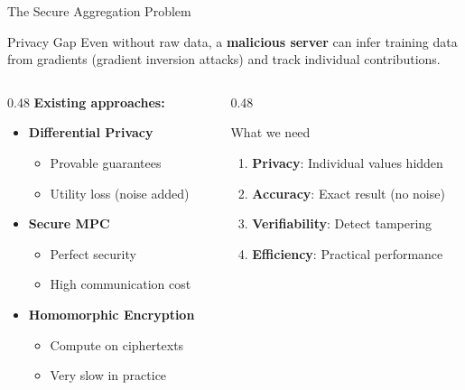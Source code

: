 \documentclass[aspectratio=169,10pt]{beamer}
\begin{document}
\begin{frame}{The Secure Aggregation Problem}
    \begin{alertblock}{Privacy Gap}
        Even without raw data, a \textbf{malicious server} can infer training data from gradients (gradient inversion attacks) and track individual contributions.
    \end{alertblock}

    \vspace{0.3em}

    \begin{columns}[T]
        \begin{column}{0.48\textwidth}
            \textbf{Existing approaches:}
            \begin{itemize}
                \item \textbf{Differential Privacy}
                    \begin{itemize}
                        \item[$+$] Provable guarantees
                        \item[$-$] Utility loss (noise added)
                    \end{itemize}
                \item \textbf{Secure MPC}
                    \begin{itemize}
                        \item[$+$] Perfect security
                        \item[$-$] High communication cost
                    \end{itemize}
                \item \textbf{Homomorphic Encryption}
                    \begin{itemize}
                        \item[$+$] Compute on ciphertexts
                        \item[$-$] Very slow in practice
                    \end{itemize}
            \end{itemize}
        \end{column}
        \begin{column}{0.48\textwidth}
            \begin{block}{What we need}
                \begin{enumerate}
                    \item \textbf{Privacy}: Individual values hidden
                    \item \textbf{Accuracy}: Exact result (no noise)
                    \item \textbf{Verifiability}: Detect tampering
                    \item \textbf{Efficiency}: Practical performance
                \end{enumerate}
            \end{block}


\end{column}
\end{columns}
\end{frame}
\end{document}
